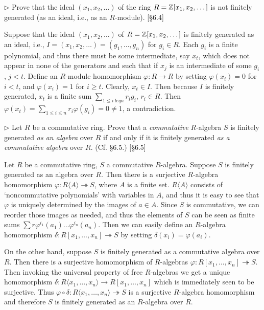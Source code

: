 \begin{problem}
	$\triangleright$ Prove that the ideal $(x_1, x_2, \dots)$ of the ring $R = \mathbb{Z}[x_1, x_2, \dots]$ is not finitely generated (as an ideal, i.e., as an $R$-module). [\S 6.4]
\end{problem}

\begin{solution}
	Suppose that the ideal $(x_1, x_2, \dots)$ of $R = \mathbb{Z}[x_1, x_2, \dots]$ is finitely generated as an ideal, i.e., $I = (x_1, x_2, \dots) = (g_1, \dots, g_n)$ for $g_i \in R$. Each $g_i$ is a finite polynomial, and thus there must be some intermediate, say $x_t$, which does not appear in none of the generators and such that if $x_j$ is an intermediate of some $g_i$, $j < t$. Define an $R$-module homomorphism $\varphi: R \to R$ by setting $\varphi(x_i) = 0$ for $i < t$, and $\varphi(x_i) = 1$ for $i \geq t$. Clearly, $x_t \in I$. Then because $I$ is finitely generated, $x_t$ is a finite sum $\sum_{1 \leq i \ leq n} r_i g_i$, $r_i \in R$. Then $\varphi(x_t) = \sum_{1 \leq i \leq n} r_i \varphi(g_i) = 0 \neq 1$, a contradiction.
\end{solution}

\begin{problem}
	$\triangleright$ Let $R$ be a commutative ring. Prove that a \emph{commutative} $R$-algebra $S$ is finitely generated \emph{as an algebra} over $R$ if and only if it is finitely generated \emph{as a commutative algebra} over $R$. (Cf. \S 6.5.) [\S 6.5]
\end{problem}

\begin{solution}
	Let $R$ be a commutative ring, $S$ a commutative $R$-algebra. Suppose $S$ is finitely generated as an algebra over $R$. Then there is a surjective $R$-algebra homomorphism $\varphi: R \langle A \rangle \twoheadrightarrow S$, where $A$ is a finite set. $R \langle A \rangle$ consists of `noncommutative polynomials' with variables in $A$, and thus it is easy to see that $\varphi$ is uniquely determined by the images of $a \in A$. Since $S$ is commutative, we can reorder those images as needed, and thus the elements of $S$ can be seen as finite sums $\sum r \varphi^{i_1}(a_1) \dots \varphi^{i_n}(a_n)$. Then we can easily define an $R$-algebra homomorphism $\delta: R[x_1, \dots, x_n] \twoheadrightarrow S$ by setting $\delta(x_i) = \varphi(a_i)$.
	
	On the other hand, suppose $S$ is finitely generated as a commutative algebra over $R$. Then there is a surjective homomorphism of $R$-algebras $\varphi: R[x_1, \dots, x_n] \twoheadrightarrow S$. Then invoking the universal property of free $R$-algebras we get a unique homomorphism $\delta: R \langle x_1, \dots, x_n \rangle \to R[x_1, \dots, x_n]$ which is immediately seen to be surjective. Thus $\varphi \circ \delta: R \langle x_1, \dots, x_n \rangle \twoheadrightarrow S$ is a surjective $R$-algebra homomorphism and therefore $S$ is finitely generated as an $R$-algebra over $R$.
\end{solution}

